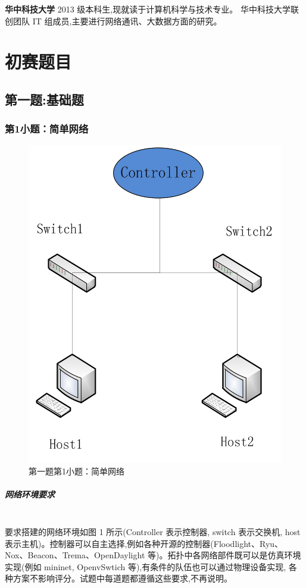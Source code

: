 \documentclass[format=draft,language=chinese,category=SDN]{hustreport}
\newcommand{\myparagraph}[1]{\paragraph{#1}\mbox{}\\}
\begin{document}

\textbf{华中科技大学} 2013 级本科生,现就读于计算机科学与技术专业。
华中科技大学联创团队 IT 组成员,主要进行网络通讯、大数据方面的研究。

\chapter{初赛题目}\label{chapter:Questions}


\section{第一题:基础题}\label{sec:Q1}
\subsection{第1小题：简单网络}\label{sec:Q1_1}

\begin{figure}[!h] \centering
\includegraphics[width=.618\textwidth]{fig/1_1-0.png}
\caption{第一题第1小题：简单网络}\label{fig:Q1_1-0}
\end{figure}

\myparagraph{网络环境要求}

要求搭建的网络环境如图 1 所示(Controller 表示控制器, switch 表示交换机, host表示主机)。控制器可以自主选择,例如各种开源的控制器(Floodlight、Ryu、
Nox、Beacon、Trema、OpenDaylight 等)。拓扑中各网络部件既可以是仿真环境实现(例如 mininet, OpenvSwtich 等),有条件的队伍也可以通过物理设备实现,
各种方案不影响评分。试题中每道题都遵循这些要求,不再说明。
\end{document}
